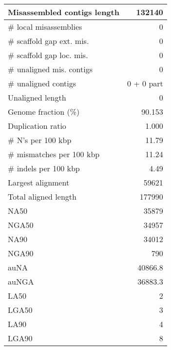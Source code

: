 \documentclass[12pt,a4paper]{article}
\begin{document}
\begin{table}[ht]
\begin{center}
\begin{tabular}{|l*{1}{|r}|}
Misassembled contigs length & 132140 \\ \hline
\# local misassemblies & 0 \\ \hline
\# scaffold gap ext. mis. & 0 \\ \hline
\# scaffold gap loc. mis. & 0 \\ \hline
\# unaligned mis. contigs & 0 \\ \hline
\# unaligned contigs & 0 + 0 part \\ \hline
Unaligned length & 0 \\ \hline
Genome fraction (\%) & 90.153 \\ \hline
Duplication ratio & 1.000 \\ \hline
\# N's per 100 kbp & 11.79 \\ \hline
\# mismatches per 100 kbp & 11.24 \\ \hline
\# indels per 100 kbp & 4.49 \\ \hline
Largest alignment & 59621 \\ \hline
Total aligned length & 177990 \\ \hline
NA50 & 35879 \\ \hline
NGA50 & 34957 \\ \hline
NA90 & 34012 \\ \hline
NGA90 & 790 \\ \hline
auNA & 40866.8 \\ \hline
auNGA & 36883.3 \\ \hline
LA50 & 2 \\ \hline
LGA50 & 3 \\ \hline
LA90 & 4 \\ \hline
LGA90 & 8 \\ \hline
\end{tabular}
\end{center}
\end{table}
\end{document}
